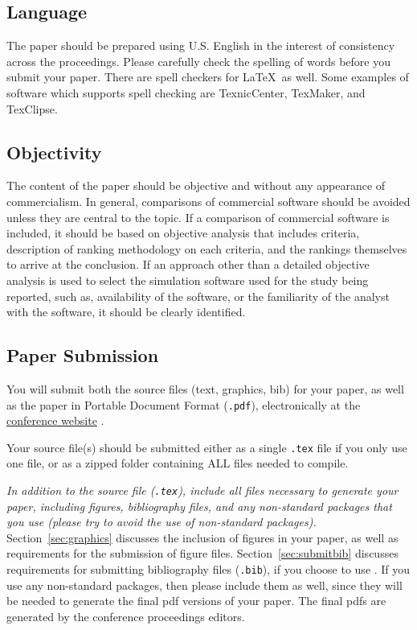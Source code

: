\documentclass{wscpaperproc}
\theoremstyle{wsc}
\begin{document}
\subsection{Language}

The paper should be prepared using U.S. English in the interest of consistency across the proceedings. Please carefully check the spelling of words before you submit your paper. There are spell checkers for \LaTeX\ as well.
Some examples of software which supports spell checking are TexnicCenter, TexMaker, and TexClipse.

\subsection{Objectivity}
The content of the paper should be objective and without any appearance of commercialism.  In general, comparisons of commercial software should be avoided unless they are central to the topic.  If a comparison of commercial software is included, it should be based on objective analysis that includes criteria, description of ranking methodology on each criteria, and the rankings themselves to arrive at the conclusion.
If an approach other than a detailed objective analysis is used to select the simulation software used for the study being reported, such as, availability of the software, or the familiarity of the analyst with the software, it should be clearly identified.

\subsection{Paper Submission}
You will submit both the source files (text, graphics, bib) for your paper, as well as the paper in Portable Document Format ({\tt .pdf}), electronically at the \href{http://www.wintersim.org}{conference website} \cite{WSC}.

Your source file(s) should be submitted either as a single {\tt .tex} file if you only use
one file, or as a zipped folder containing ALL files needed to compile.

{\em In addition to the source file ({\tt .tex}), include all files necessary to generate your paper, including figures, bibliography files, and any non-standard packages that you use (please try to avoid the use of non-standard packages).} Section~\ref{sec:graphics} discusses the inclusion of figures in your paper, as well as requirements for the submission of figure files.
Section~\ref{sec:submitbib} discusses requirements for submitting bibliography files ({\tt .bib}), if you choose to use \BibTeX. If you use any non-standard packages, then please include them as well, since they will be needed to generate the final pdf versions of your paper.
The final pdfs are generated by the conference proceedings editors.
\end{document}
